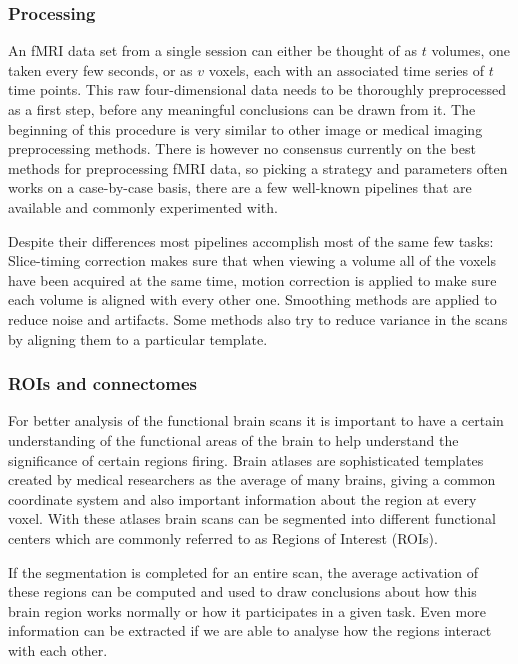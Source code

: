 		
		\subsubsection{Processing}
		
		An fMRI data set from a single session can either be thought of as $t$ volumes, one taken every few seconds, or as $v$ voxels, each with an associated time series of $t$ time points\cite{smith2004overview}. This raw four-dimensional data needs to be thoroughly preprocessed as a first step, before any meaningful conclusions can be drawn from it. The beginning of this procedure is very similar to other image or medical imaging preprocessing methods. There is however no consensus currently on the best methods for preprocessing fMRI data, so picking a strategy and parameters often works on a case-by-case basis, there are a few well-known pipelines that are available and commonly experimented with\cite{strother2006evaluating}.
		
		Despite their differences most pipelines accomplish most of the same few tasks: Slice-timing correction makes sure that when viewing a volume all of the voxels have been acquired at the same time, motion correction is applied to make sure each volume is aligned with every other one. Smoothing methods are applied to reduce noise and artifacts. Some methods also try to reduce variance in the scans by aligning them to a particular template.
		
		\subsubsection{ROIs and connectomes}
		
		For better analysis of the functional brain scans it is important to have a certain understanding of the functional areas of the brain to help understand the significance of certain regions firing. Brain atlases are sophisticated templates created by medical researchers as the average of many brains, giving a common coordinate system and also important information about the region at every voxel. With these atlases brain scans can be segmented into different functional centers which are commonly referred to as Regions of Interest (ROIs). 
		
		If the segmentation is completed for an entire scan, the average activation of these regions can be computed and used to draw conclusions about how this brain region works normally or how it participates in a given task. Even more information can be extracted if we are able to analyse how the regions interact with each other\cite{rogers2007assessing}. 
		

